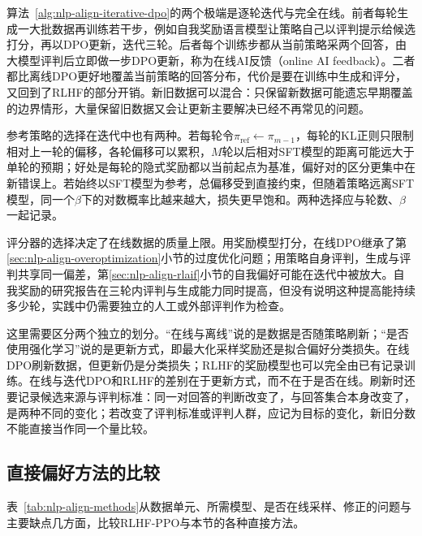 算法~\ref{alg:nlp-align-iterative-dpo}的两个极端是逐轮迭代与完全在线。前者每轮生成一大批数据再训练若干步，例如自我奖励语言模型让策略自己以评判提示给候选打分，再以DPO更新，迭代三轮。后者每个训练步都从当前策略采两个回答，由大模型评判后立即做一步DPO更新，称为在线AI反馈（online AI feedback）。二者都比离线DPO更好地覆盖当前策略的回答分布，代价是要在训练中生成和评分，又回到了RLHF的部分开销。新旧数据可以混合：只保留新数据可能遗忘早期覆盖的边界情形，大量保留旧数据又会让更新主要解决已经不再常见的问题。

参考策略的选择在迭代中也有两种。若每轮令$\pi_{\mathrm{ref}}\gets\pi_{m-1}$，每轮的KL正则只限制相对上一轮的偏移，各轮偏移可以累积，$M$轮以后相对SFT模型的距离可能远大于单轮的预期；好处是每轮的隐式奖励都以当前起点为基准，偏好对的区分更集中在新错误上。若始终以SFT模型为参考，总偏移受到直接约束，但随着策略远离SFT模型，同一个$\beta$下的对数概率比越来越大，损失更早饱和。两种选择应与轮数、$\beta$一起记录。

评分器的选择决定了在线数据的质量上限。用奖励模型打分，在线DPO继承了第\ref{sec:nlp-align-overoptimization}小节的过度优化问题；用策略自身评判，生成与评判共享同一偏差，第\ref{sec:nlp-align-rlaif}小节的自我偏好可能在迭代中被放大。自我奖励的研究报告在三轮内评判与生成能力同时提高，但没有说明这种提高能持续多少轮\cite{nlp-align-yuan2024selfreward}，实践中仍需要独立的人工或外部评判作为检查。

这里需要区分两个独立的划分。“在线与离线”说的是数据是否随策略刷新；“是否使用强化学习”说的是更新方式，即最大化采样奖励还是拟合偏好分类损失。在线DPO刷新数据，但更新仍是分类损失；RLHF的奖励模型也可以完全由已有记录训练。在线与迭代DPO和RLHF的差别在于更新方式，而不在于是否在线。刷新时还要记录候选来源与评判标准：同一对回答的判断改变了，与回答集合本身改变了，是两种不同的变化；若改变了评判标准或评判人群，应记为目标的变化，新旧分数不能直接当作同一个量比较。

\subsection{直接偏好方法的比较}
\label{sec:nlp-align-comparison}

表~\ref{tab:nlp-align-methods}从数据单元、所需模型、是否在线采样、修正的问题与主要缺点几方面，比较RLHF-PPO与本节的各种直接方法。

